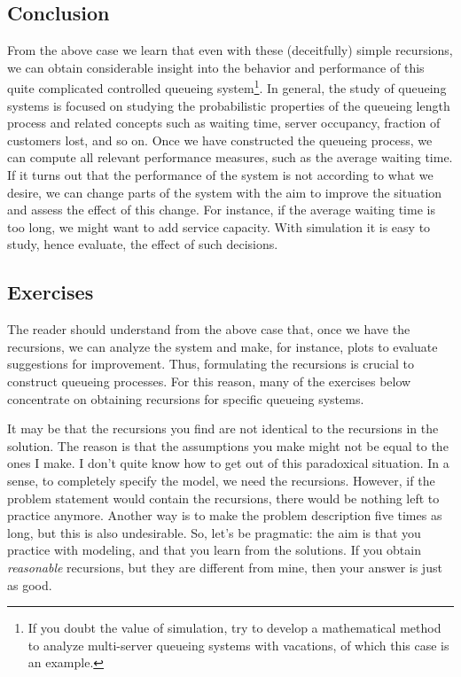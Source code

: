 \subsection*{Conclusion}
\label{sec:conclusion}

From the above case we learn that even with these (deceitfully) simple recursions, we can obtain considerable insight into the behavior and performance of this quite complicated controlled queueing system\footnote{If you doubt the value of simulation, try to develop a mathematical method to analyze multi-server queueing systems with vacations, of which this case is an example.}.
In general, the study of queueing systems is focused on studying the probabilistic properties of the queueing length process and related concepts such as waiting time, server occupancy, fraction of customers lost, and so on.
Once we have constructed the queueing process, we can compute all relevant performance measures, such as the average waiting time.
If it turns out that the performance of the system is not according to what we desire, we can change parts of the system with the aim to improve the situation and assess the effect of this change.
For instance, if the average waiting time is too long, we might want to add service capacity.
With simulation it is easy to study, hence evaluate, the effect of such decisions.

\subsection*{Exercises}
\label{sec:exercises-1}


The reader should understand from the above case that, once we have the recursions, we can analyze the system and make, for instance, plots to evaluate suggestions for improvement.
Thus, formulating the recursions is crucial to construct queueing processes.
For this reason, many of the exercises below concentrate on obtaining recursions for specific queueing systems.

It may be that the recursions you find are not identical to the recursions in the solution.
The reason is that the assumptions you make might not be equal to the ones I make.
I don't quite know how to get out of this paradoxical situation.
In a sense, to completely specify the model, we need the recursions.
However, if the problem statement would contain the recursions, there would be nothing left to practice anymore.
Another way is to make the problem description five times as long, but this is also undesirable.
So, let's be pragmatic: the aim is that you practice with modeling, and that you learn from the solutions.
If you obtain \emph{reasonable} recursions, but they are different from mine, then your answer is just as good.

